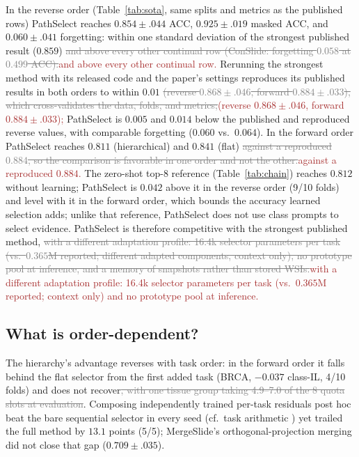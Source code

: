\documentclass{article}
\newif\ifmarkup \markuptrue
\newcommand{\repc}[3]{\ifmarkup\textcolor{gray}{\sout{#2}}\textcolor{#1}{#3}\else#3\fi}
\newcommand{\repB}[2]{\repc{brown}{#1}{#2}}   %
\begin{document}
In the reverse order (Table~\ref{tab:sota}, same splits and metrics as the published rows) PathSelect reaches $0.854{\pm}.044$ ACC, $0.925{\pm}.019$ masked ACC, and $0.060{\pm}.041$ forgetting: within one standard deviation of the strongest published result ($0.859$) \repB{and above every other continual row (ConSlide: forgetting $0.058$ at $0.499$ ACC).}{and above every other continual row.} Rerunning the strongest method with its released code and the paper's settings reproduces its published results in both orders to within $0.01$ \repB{(reverse $0.868{\pm}.046$, forward $0.884{\pm}.033$), which cross-validates the data, folds, and metrics;}{(reverse $0.868{\pm}.046$, forward $0.884{\pm}.033$);} PathSelect is $0.005$ and $0.014$ below the published and reproduced reverse values, with comparable forgetting ($0.060$ vs.\ $0.064$). In the forward order PathSelect reaches $0.811$ (hierarchical) and $0.841$ (flat) \repB{against a reproduced $0.884$, so the comparison is favorable in one order and not the other.}{against a reproduced $0.884$.} The zero-shot top-8 reference (Table~\ref{tab:chain}) reaches $0.812$ without learning; PathSelect is $0.042$ above it in the reverse order (9/10 folds) and level with it in the forward order, which bounds the accuracy learned selection adds; unlike that reference, PathSelect does not use class prompts to select evidence. PathSelect is therefore competitive with the strongest published method, \repB{with a different adaptation profile: 16.4k selector parameters per task (vs.\ $0.365$M reported; different adapted components, context only), no prototype pool at inference, and a memory of snapshots rather than stored WSIs.}{with a different adaptation profile: 16.4k selector parameters per task (vs.\ $0.365$M reported; context only) and no prototype pool at inference.}

\subsection{What is order-dependent?}
\label{ssec:order}

The hierarchy's advantage reverses with task order: in the forward order it falls behind the flat selector from the first added task (BRCA, $-0.037$ class-IL, 4/10 folds) and does not recover\repB{, with one tissue group taking 4.9--7.0 of the 8 quota slots at evaluation}{}. Composing independently trained per-task residuals post hoc beat the bare sequential selector in every seed (cf.\ task arithmetic \cite{ilharco2023task}) yet trailed the full method by $13.1$ points (5/5); MergeSlide's orthogonal-projection merging \cite{bui2026mergeslide} did not close that gap ($0.709{\pm}.035$).
\end{document}
